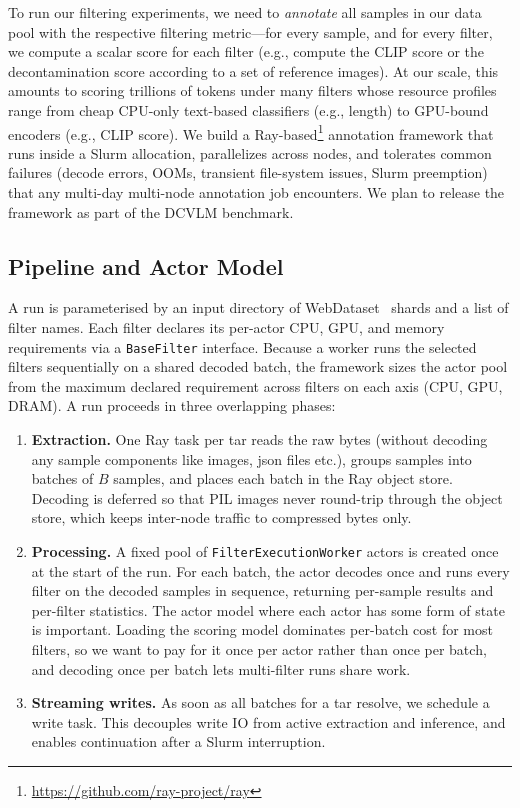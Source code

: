 To run our filtering experiments, we need to \emph{annotate} all samples in our data pool with the respective filtering metric---for every sample, and for every filter, we compute a scalar score for each filter (e.g., compute the CLIP score or the decontamination score according to a set of reference images).
At our scale, this amounts to scoring trillions of tokens under many filters whose resource profiles range from cheap CPU-only text-based classifiers (e.g., length) to GPU-bound encoders (e.g., CLIP score).
We build a Ray-based\footnote{\href{https://github.com/ray-project/ray}{https://github.com/ray-project/ray}} annotation framework that runs inside a Slurm allocation, parallelizes across nodes, and tolerates common failures (decode errors, OOMs, transient file-system issues, Slurm preemption) that any multi-day multi-node annotation job encounters.
We plan to release the framework as part of the DCVLM benchmark.

\subsection{Pipeline and Actor Model}\label{app:annotation-pipeline}

A run is parameterised by an input directory of WebDataset~\citep{webdataset} shards and a list of filter names.
Each filter declares its per-actor CPU, GPU, and memory requirements via a \texttt{BaseFilter} interface.
Because a worker runs the selected filters sequentially on a shared decoded batch, the framework sizes the actor pool from the maximum declared requirement across filters on each axis (CPU, GPU, DRAM).
A run proceeds in three overlapping phases:

\begin{enumerate}[leftmargin=*,itemsep=1pt]
\item \textbf{Extraction.} One Ray task per tar reads the raw bytes (without decoding any sample components like images, json files etc.), groups samples into batches of $B$ samples, and places each batch in the Ray object store.
Decoding is deferred so that PIL images never round-trip through the object store, which keeps inter-node traffic to compressed bytes only.
\item \textbf{Processing.} A fixed pool of \texttt{FilterExecutionWorker} actors is created once at the start of the run. 
For each batch, the actor decodes once and runs every filter on the decoded samples in sequence, returning per-sample results and per-filter statistics.
The actor model where each actor has some form of state is important.
Loading the scoring model dominates per-batch cost for most filters, so we want to pay for it once per actor rather than once per batch, and decoding once per batch lets multi-filter runs share work.
\item \textbf{Streaming writes.} As soon as all batches for a tar resolve, we schedule a write task.
This decouples write IO from active extraction and inference, and enables continuation after a Slurm interruption.
\end{enumerate}

